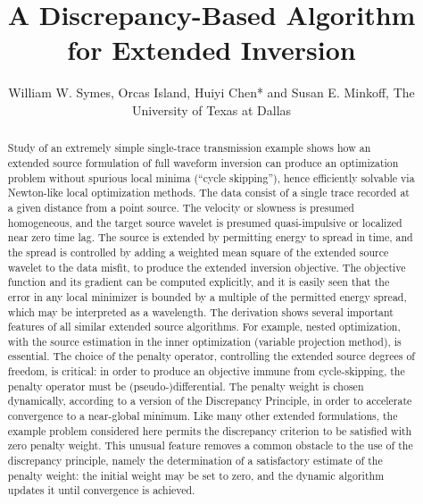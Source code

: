 \title{A Discrepancy-Based Algorithm for Extended Inversion}
\author{William W. Symes, Orcas Island, Huiyi Chen* and Susan E. Minkoff, The University of Texas at Dallas}



\maketitle
\begin{abstract}
  Study of an extremely simple single-trace transmission example shows
  how an extended source formulation of full waveform inversion can
  produce an optimization problem without spurious local minima
  (``cycle skipping''), hence efficiently solvable via Newton-like
  local optimization methods. The data consist of a single trace
  recorded at a given distance from a point source. The velocity or
  slowness is presumed homogeneous, and the target source wavelet is
  presumed quasi-impulsive or localized near zero time lag. The source
  is extended by permitting energy to spread in time, and the spread
  is controlled by adding a weighted mean square of the extended
  source wavelet to the data misfit, to produce the extended inversion
  objective. The objective function and its gradient can be computed
  explicitly, and it is easily seen that the error in any local
  minimizer is bounded by a multiple of the permitted energy spread,
  which may be interpreted as a wavelength. The derivation shows several
  important features of all similar extended source algorithms. For
  example, nested optimization, with the source estimation in the
  inner optimization (variable projection method), is essential. The
  choice of the penalty operator, controlling the extended source
  degrees of freedom, is critical: in order to produce an objective
  immune from cycle-skipping, the penalty operator must be
  (pseudo-)differential. The penalty weight is chosen dynamically,
  according to a version of the Discrepancy Principle, in order to
  accelerate convergence to a near-global minimum. Like many other
  extended formulations, the example problem considered here permits
  the discrepancy criterion to be satisfied with zero penalty
  weight. This unusual feature removes a common obstacle to the use of
  the discrepancy principle, namely the determination of a
  satisfactory estimate of the penalty weight: the initial weight may
  be set to zero, and the dynamic algorithm updates it until
  convergence is achieved.

\end{abstract}

